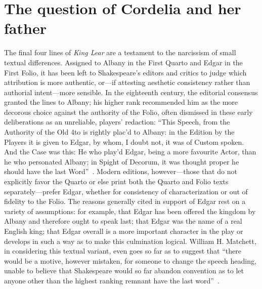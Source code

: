 \chapter{The question of Cordelia and her father\label{ch:KingLear}}
The final four lines of \emph{King Lear} are a testament to the narcissism of small textual differences. Assigned to Albany in the First Quarto and Edgar in the First Folio, it has been left to Shakespeare's editors and critics to judge which attribution is more authentic, or---if attesting aesthetic consistency rather than authorial intent---more sensible. In the eighteenth century, the editorial consensus granted the lines to Albany; his higher rank recommended him as the more decorous choice against the authority of the Folio, often dismissed in these early deliberations as an unreliable, players' redaction: ``This Speech, from the Authority of the Old 4to is rightly plac'd to Albany: in the Edition by the Players it is given to Edgar, by whom, I doubt not, it was of Custom spoken. And the Case was this: He who play'd Edgar, being a more favourite Actor, than he who personated Albany; in Spight of Decorum, it was thought proper he should have the last Word''~\cite[219]{Theobald}.
Modern editions, however---those that do not explicitly favor the Quarto or else print both the Quarto and Folio texts separately---prefer Edgar, whether for consistency of characterization or out of fidelity to the Folio. The reasons generally cited in support of Edgar rest on a variety of assumptions: for example, that Edgar has been offered the kingdom by Albany and therefore ought to speak last; that Edgar was the name of a real English king; that Edgar overall is a more important character in the play or develops in such a way as to make this culmination logical. William H. Matchett, in considering this textual variant, even goes so far as to suggest that ``there would be a motive, however mistaken, for someone to change the speech heading, unable to believe that Shakespeare would so far abandon convention as to let anyone other than the highest ranking remnant have the last word''~\cite[208n]{Matchett}.

